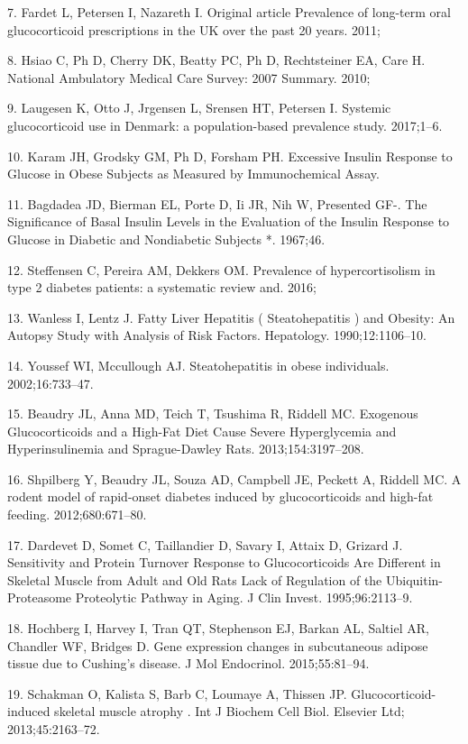 \documentclass[11pt]{article} %
\begin{document}
7. Fardet L, Petersen I, Nazareth I. Original article Prevalence of
long-term oral glucocorticoid prescriptions in the UK over the past 20
years. 2011;

8. Hsiao C, Ph D, Cherry DK, Beatty PC, Ph D, Rechtsteiner EA, Care H.
National Ambulatory Medical Care Survey: 2007 Summary. 2010;

9. Laugesen K, Otto J, Jrgensen L, Srensen HT, Petersen I. Systemic
glucocorticoid use in Denmark: a population-based prevalence study.
2017;1--6.

10. Karam JH, Grodsky GM, Ph D, Forsham PH. Excessive Insulin Response
to Glucose in Obese Subjects as Measured by Immunochemical Assay.

11. Bagdadea JD, Bierman EL, Porte D, Ii JR, Nih W, Presented GF-. The
Significance of Basal Insulin Levels in the Evaluation of the Insulin
Response to Glucose in Diabetic and Nondiabetic Subjects *. 1967;46.

12. Steffensen C, Pereira AM, Dekkers OM. Prevalence of hypercortisolism
in type 2 diabetes patients: a systematic review and. 2016;

13. Wanless I, Lentz J. Fatty Liver Hepatitis ( Steatohepatitis ) and
Obesity: An Autopsy Study with Analysis of Risk Factors. Hepatology.
1990;12:1106--10.

14. Youssef WI, Mccullough AJ. Steatohepatitis in obese individuals.
2002;16:733--47.

15. Beaudry JL, Anna MD, Teich T, Tsushima R, Riddell MC. Exogenous
Glucocorticoids and a High-Fat Diet Cause Severe Hyperglycemia and
Hyperinsulinemia and Sprague-Dawley Rats. 2013;154:3197--208.

16. Shpilberg Y, Beaudry JL, Souza AD, Campbell JE, Peckett A, Riddell
MC. A rodent model of rapid-onset diabetes induced by glucocorticoids
and high-fat feeding. 2012;680:671--80.

17. Dardevet D, Somet C, Taillandier D, Savary I, Attaix D, Grizard J.
Sensitivity and Protein Turnover Response to Glucocorticoids Are
Different in Skeletal Muscle from Adult and Old Rats Lack of Regulation
of the Ubiquitin-Proteasome Proteolytic Pathway in Aging. J Clin Invest.
1995;96:2113--9.

18. Hochberg I, Harvey I, Tran QT, Stephenson EJ, Barkan AL, Saltiel AR,
Chandler WF, Bridges D. Gene expression changes in subcutaneous adipose
tissue due to Cushing's disease. J Mol Endocrinol. 2015;55:81--94.

19. Schakman O, Kalista S, Barb C, Loumaye A, Thissen JP.
Glucocorticoid-induced skeletal muscle atrophy . Int J Biochem Cell
Biol. Elsevier Ltd; 2013;45:2163--72.
\end{document}
